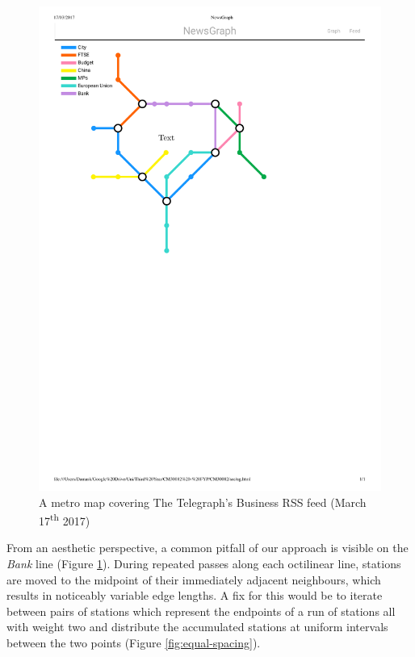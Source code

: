 \begin{figure}[htbp!]
	\centering
	\includegraphics[width=.83\textwidth]{img/results/telegraph-business-tfidf.pdf}
	\caption{A metro map covering The Telegraph's Business RSS feed (March 17\textsuperscript{th} 2017)}
	\label{fig:telegraph-business}
\end{figure}

From an aesthetic perspective, a common pitfall of our approach is visible on the \textit{Bank} line (Figure \ref{fig:telegraph-business}). During repeated passes along each octilinear line, stations are moved to the midpoint of their immediately adjacent neighbours, which results in noticeably variable edge lengths. A fix for this would be to iterate between pairs of stations which represent the endpoints of a run of stations all with weight two and distribute the accumulated stations at uniform intervals between the two points (Figure \ref{fig:equal-spacing}).


